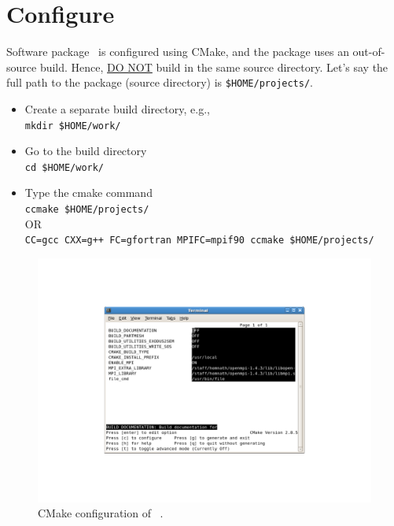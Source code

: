 \section{Configure}
\label{sec:configure}

Software package \pack\ is configured using CMake, and the package uses an out-of-source build. Hence, \underline{DO NOT} build in the same source directory. Let's say the full path to the package (source directory) is \texttt{\$HOME/projects/\pack}.

\begin{itemize}
\item Create a separate build directory, e.g.,\\
\texttt{mkdir \$HOME/work/\pack}

\item Go to the build directory \\
\texttt{cd \$HOME/work/\pack}

\item Type the cmake command \\
\texttt{ccmake \$HOME/projects/\pack} \\
OR \\
\texttt{CC=gcc CXX=g++ FC=gfortran MPIFC=mpif90 ccmake \$HOME/projects/\pack} \\

\end{itemize}

\begin{figure}[ht]
\centering
\includegraphics[scale=1.0]{cmake}
\caption{CMake configuration of \pack\ .}
\label{fig:cmake}
\end{figure}

